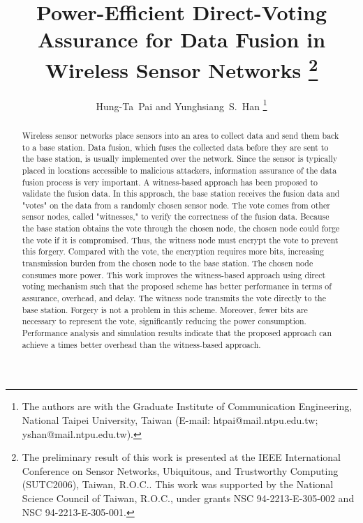 \documentclass[12pt, onecolumn, draftcls]{IEEEtran}
\begin{document}
\title{Power-Efficient Direct-Voting  Assurance for Data Fusion in Wireless Sensor Networks
\thanks{The preliminary result of this work is presented at the
IEEE International Conference on Sensor Networks, Ubiquitous, and
Trustworthy Computing (SUTC2006), Taiwan, R.O.C.. This work was
supported by the National Science Council of Taiwan, R.O.C., under
grants NSC 94-2213-E-305-002 and NSC 94-2213-E-305-001.}}

\author{Hung-Ta~Pai and Yunghsiang~S.~Han \thanks{The authors are
with the Graduate Institute of Communication Engineering, National
Taipei University, Taiwan (E-mail: htpai@mail.ntpu.edu.tw;
yshan@mail.ntpu.edu.tw).}}

\maketitle \thispagestyle{empty}

\setlength{\baselineskip}{24pt}
\begin{abstract}
\noindent Wireless sensor networks place sensors into an area to
collect data and send them back to a base station. Data fusion,
which fuses the collected data before they are sent to the base
station, is usually implemented over the network. Since the sensor
is typically placed in locations accessible to malicious attackers,
information assurance of the data fusion process is very important.
A witness-based approach has been proposed to validate the fusion
data. In this approach, the base station receives the fusion data
and "votes" on the data from a randomly chosen sensor node. The vote
comes from other sensor nodes, called "witnesses," to verify the
correctness of the fusion data. Because the base station obtains the
vote through the chosen node, the chosen node could forge the vote
if it is compromised. Thus, the witness node must encrypt the vote
to prevent this forgery. Compared with the vote, the encryption
requires more bits, increasing transmission burden from the chosen
node to the base station. The chosen node consumes more power. This
work improves the witness-based approach using direct voting
mechanism such that the proposed scheme has better performance in
terms of assurance, overhead, and delay. The witness node transmits
the vote directly to the base station. Forgery is not a problem in
this scheme. Moreover, fewer bits are necessary to represent the
vote, significantly reducing the power consumption. Performance
analysis and simulation results indicate that the proposed approach
can achieve a  times better overhead than the witness-based
approach.
\end{abstract}
\end{document}
